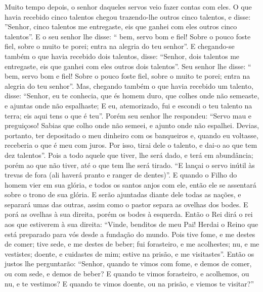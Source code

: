 {  Muito tempo depois, o senhor daqueles servos veio fazer contas com eles.
  O que havia recebido cinco talentos chegou trazendo-lhe outros cinco talentos, e disse: ”Senhor, cinco talentos me entregaste, eis que ganhei com eles outros cinco talentos”.
  E o seu senhor lhe disse: “
{} bem, servo bom e fiel! Sobre o pouco foste fiel, sobre o muito te porei; entra na alegria do teu senhor”.
  E chegando-se também o que havia recebido dois talentos, disse: “Senhor, dois talentos me entregaste, eis que ganhei com eles outros dois talentos”.
  Seu senhor lhe disse: “
{} bem, servo bom e fiel! Sobre o pouco foste fiel, sobre o muito te porei; entra na alegria do teu senhor”.
  Mas, chegando também o que havia recebido um talento, disse: “Senhor, eu te conhecia, que és homem duro, que colhes onde não semeaste, e ajuntas onde não espalhaste;
  E eu, atemorizado, fui e escondi o teu talento na terra; eis aqui tens o que é teu”.
  Porém seu senhor lhe respondeu: “Servo mau e preguiçoso! Sabias que colho onde não semeei, e ajunto onde não espalhei.
  Devias, portanto, ter depositado o meu dinheiro com os banqueiros e, quando eu voltasse, receberia o que é meu com juros.
  Por isso, tirai dele o talento, e dai-o ao que tem dez talentos”.
  Pois a todo aquele que tiver, lhe será dado, e terá em abundância; porém ao que não tiver, até o que tem lhe será tirado.
  “E lançai o servo inútil às trevas de fora (ali haverá pranto e ranger de dentes)”.
  E quando o Filho do homem vier em sua glória, e todos os santos anjos com ele, então ele se assentará sobre o trono de sua glória.
  E serão ajuntadas diante dele todas as nações, e separará
{} umas das outras, assim como o pastor separa as ovelhas dos bodes.
  E porá as ovelhas à sua direita, porém os bodes à esquerda.
  Então o Rei dirá o rei aos que estiverem à sua direita: “Vinde, benditos de meu Pai! Herdai o Reino que está preparado para vós desde a fundação do mundo.
  Pois tive fome, e me destes de comer; tive sede, e me destes de beber; fui forasteiro, e me acolhestes;
   nu, e me vestistes;
{} doente, e cuidastes de mim; estive na prisão, e me visitastes”.
  Então os justos lhe perguntarão: “Senhor, quando te vimos com fome, e
{} demos de comer, ou com sede, e
{} demos de beber?
  E quando te vimos forasteiro, e
{} acolhemos, ou nu, e te vestimos?
  E quando te vimos doente, ou na prisão, e viemos te visitar?”
}
